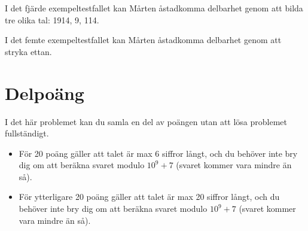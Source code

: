 I det fjärde exempeltestfallet kan Mårten åstadkomma delbarhet genom att bilda tre olika tal: 1914, 9, 114.

I det femte exempeltestfallet kan Mårten åstadkomma delbarhet genom att stryka ettan.

\section*{Delpoäng}
I det här problemet kan du samla en del av poängen utan att lösa problemet fullständigt.

\begin{itemize}
    \item För 20 poäng gäller att talet är max 6 siffror långt, och du behöver inte bry dig om att beräkna svaret modulo $10^9 + 7$ (svaret kommer vara mindre än så).
    \item För ytterligare 20 poäng gäller att talet är max 20 siffror långt, och du behöver inte bry dig om att beräkna svaret modulo $10^9 + 7$ (svaret kommer vara mindre än så).
\end{itemize}
